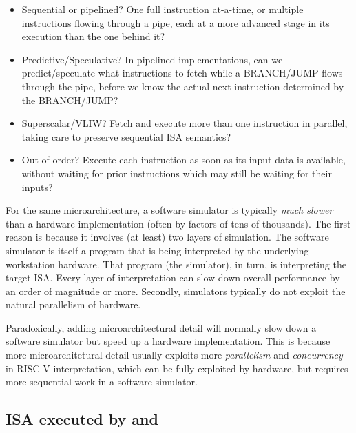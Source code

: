 \begin{itemize}

  \item Sequential or pipelined?  One full instruction at-a-time, or
    multiple instructions flowing through a pipe, each at a more
    advanced stage in its execution than the one behind it?

  \item Predictive/Speculative? In pipelined implementations, can we
    predict/speculate what instructions to fetch while a BRANCH/JUMP
    flows through the pipe, before we know the actual next-instruction
    determined by the BRANCH/JUMP?

  \item Superscalar/VLIW? Fetch and execute more than one instruction
    in parallel, taking care to preserve sequential ISA semantics?

  \item Out-of-order? Execute each instruction as soon as its input
    data is available, without waiting for prior instructions which
    may still be waiting for their inputs?

\end{itemize}

For the same microarchitecture, a software simulator is typically
\emph{much slower} than a hardware implementation (often by factors of
tens of thousands).  The first reason is because it involves (at
least) two layers of simulation. The software simulator is itself a
program that is being interpreted by the underlying workstation
hardware.  That program (the simulator), in turn, is interpreting the
target ISA.  Every layer of interpretation can slow down overall
performance by an order of magnitude or more.  Secondly, simulators
typically do not exploit the natural parallelism of hardware.

Paradoxically, adding microarchitectural detail will normally slow
down a software simulator but speed up a hardware implementation.
This is because more microarchitetural detail usually exploits more
\emph{parallelism} and \emph{concurrency} in RISC-V interpretation,
which can be fully exploited by hardware, but requires more sequential
work in a software simulator.


\subsection{ISA executed by {\DRUM} and {\FIFE}}

